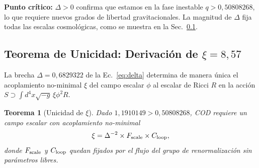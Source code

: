\documentclass[12pt, a4paper]{article}
\theoremstyle{miuThm}
\newtheorem{theorem}{Teorema}[section]
\theoremstyle{remark}
\newcommand{\qborn}{1{,}1910149}
\newcommand{\qcrit}{0{,}50808268}
\begin{document}
\textbf{Punto crítico:} $\Delta > 0$ confirma que estamos en la fase inestable
$q > \qcrit$, lo que requiere nuevos grados de libertad gravitacionales. La magnitud
de $\Delta$ fija todas las escalas cosmológicas, como se muestra en la
Sec.~\ref{sec:xi}.

\subsection{Teorema de Unicidad: Derivación de $\xi = 8{,}57$}
\label{sec:xi}

La brecha $\Delta = 0{,}6829322$ de la Ec.~\eqref{eq:delta} determina de manera
única el acoplamiento no-minimal $\xi$ del campo escalar $\phi$ al escalar de Ricci
$R$ en la acción $S \supset \int d^4x \sqrt{-g} \, \xi \phi^2 R$.

\begin{theorem}[Unicidad de $\xi$]
\label{thm:xi}
Dado $\qborn > \qcrit$, COD requiere un campo escalar con acoplamiento no-minimal
\begin{equation}
\xi = \Delta^{-2} \times F_{\rm scale} \times C_{\rm loop},
\label{eq:xi_master}
\end{equation}
donde $F_{\rm scale}$ y $C_{\rm loop}$ quedan fijados por el flujo del grupo de
renormalización sin parámetros libres.
\end{theorem}
\end{document}
